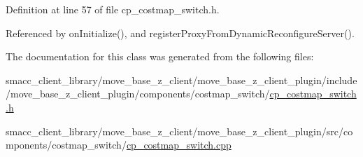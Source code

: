 Definition at line 57 of file cp\+\_\+costmap\+\_\+switch.\+h.



Referenced by on\+Initialize(), and register\+Proxy\+From\+Dynamic\+Reconfigure\+Server().



The documentation for this class was generated from the following files\+:\begin{DoxyCompactItemize}
\item 
smacc\+\_\+client\+\_\+library/move\+\_\+base\+\_\+z\+\_\+client/move\+\_\+base\+\_\+z\+\_\+client\+\_\+plugin/include/move\+\_\+base\+\_\+z\+\_\+client\+\_\+plugin/components/costmap\+\_\+switch/\hyperlink{cp__costmap__switch_8h}{cp\+\_\+costmap\+\_\+switch.\+h}\item 
smacc\+\_\+client\+\_\+library/move\+\_\+base\+\_\+z\+\_\+client/move\+\_\+base\+\_\+z\+\_\+client\+\_\+plugin/src/components/costmap\+\_\+switch/\hyperlink{cp__costmap__switch_8cpp}{cp\+\_\+costmap\+\_\+switch.\+cpp}\end{DoxyCompactItemize}
